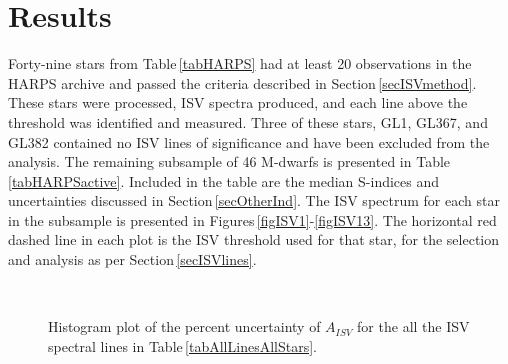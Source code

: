 \section{Results}
\label{secResults}
Forty-nine stars from Table\,\ref{tabHARPS} had at least 20 observations in the HARPS archive and passed the criteria described in Section\,\ref{secISVmethod}. These stars were processed, ISV spectra produced, and each line above the threshold was identified and measured. Three of these stars, GL1, GL367, and GL382 contained no ISV lines of significance and have been excluded from the analysis. The remaining subsample of 46 M-dwarfs is presented in Table\,\ref{tabHARPSactive}. Included in the table are the median S-indices and uncertainties discussed in Section\,\ref{secOtherInd}. The ISV spectrum for each star in the subsample is presented in Figures\,\ref{figISV1}-\ref{figISV13}. The horizontal red dashed line in each plot is the ISV threshold used for that star, for the selection and analysis as per Section\,\ref{secISVlines}.\\

\begin{figure}[!h]
    \centering
	\captionsetup{width=.8\textwidth}
    \\
    \caption{Histogram plot of the percent uncertainty of $A_{ISV}$ for the all the ISV spectral lines in Table\,\ref{tabAllLinesAllStars}.}
    \label{figISVpercentageuncertainty}
\end{figure}

